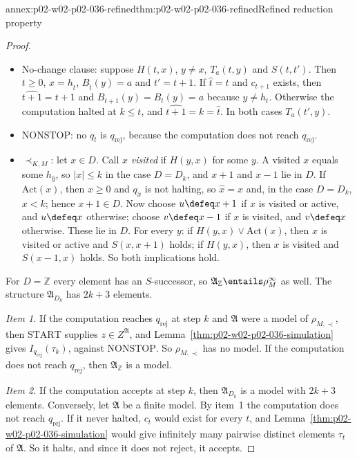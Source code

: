 \begin{annexitem}{annex:p02-w02-p02-036-refined}{thm:p02-w02-p02-036-refined}{Refined reduction property}
\begin{proof}
\begin{itemize}
  before \(\hat t=t\), \(c_{t+1}\) exists, \(x'=h_t\), \(a=B_t(h_t)\),
  \(t'=t+1\), and now \(x=h_t-1=h_{t+1}\) and \(B_{t+1}(h_t)=b\).  This gives
  \(I_{q'}(t')\), \(H(t',x)\) and \(T_b(t',x')\).
\item No-change clause: suppose \(H(t,x)\), \(y\neq x\), \(T_a(t,y)\) and
  \(S(t,t')\).  Then \(t\geq0\), \(x=h_{\hat t}\), \(B_{\hat t}(y)=a\) and
  \(t'=t+1\).  If \(\hat t=t\) and \(c_{t+1}\) exists, then
  \(\widehat{t+1}=t+1\) and \(B_{t+1}(y)=B_t(y)=a\) because \(y\neq h_t\).
  Otherwise the computation halted at \(k\leq t\), and
  \(\widehat{t+1}=k=\hat t\).  In both cases \(T_a(t',y)\).
\item \(\mathrm{NONSTOP}\): no \(q_{\hat t}\) is \(q_{\mathrm{rej}}\), because
  the computation does not reach \(q_{\mathrm{rej}}\).
\item \(\prec_{K,M}\): let \(x\in D\).  Call \(x\) \emph{visited} if \(H(y,x)\)
  for some \(y\).  A visited \(x\) equals some \(h_{\hat y}\), so
  \(\lvert x\rvert\leq k\) in the case \(D=D_k\), and \(x+1\) and \(x-1\) lie
  in \(D\).  If \(\mathrm{Act}(x)\), then \(x\geq0\) and \(q_{\hat x}\) is not
  halting, so \(\hat x=x\) and, in the case \(D=D_k\), \(x<k\); hence
  \(x+1\in D\).  Now choose \(u\defeq x+1\) if \(x\) is visited or active, and
  \(u\defeq x\) otherwise; choose \(v\defeq x-1\) if \(x\) is visited, and
  \(v\defeq x\) otherwise.  These lie in \(D\).  For every \(y\): if
  \(H(y,x)\lor\mathrm{Act}(x)\), then \(x\) is visited or active and
  \(S(x,x+1)\) holds; if \(H(y,x)\), then \(x\) is visited and \(S(x-1,x)\)
  holds.  So both implications hold.
\end{itemize}
For \(D=\mathbb Z\) every element has an \(S\)-successor, so
\(\mathfrak A_{\mathbb Z}\entails\rho^{\infty}_M\) as well.  The structure
\(\mathfrak A_{D_k}\) has \(2k+3\) elements.

\emph{Item 1.}  If the computation reaches \(q_{\mathrm{rej}}\) at step \(k\)
and \(\mathfrak A\) were a model of \(\rho_{M,\prec}\), then \(\mathrm{START}\)
supplies \(z\in Z^{\mathfrak A}\), and
Lemma~\ref{thm:p02-w02-p02-036-simulation} gives \(I_{q_{\mathrm{rej}}}(\tau_k)\),
against \(\mathrm{NONSTOP}\).  So \(\rho_{M,\prec}\) has no model.  If the
computation does not reach \(q_{\mathrm{rej}}\), then
\(\mathfrak A_{\mathbb Z}\) is a model.

\emph{Item 2.}  If the computation accepts at step \(k\), then
\(\mathfrak A_{D_k}\) is a model with \(2k+3\) elements.  Conversely, let
\(\mathfrak A\) be a finite model.  By item~1 the computation does not reach
\(q_{\mathrm{rej}}\).  If it never halted, \(c_t\) would exist for every \(t\),
and Lemma~\ref{thm:p02-w02-p02-036-simulation} would give infinitely many
pairwise distinct elements \(\tau_t\) of \(\mathfrak A\).  So it halts, and
since it does not reject, it accepts.


\end{proof}
\end{annexitem}
